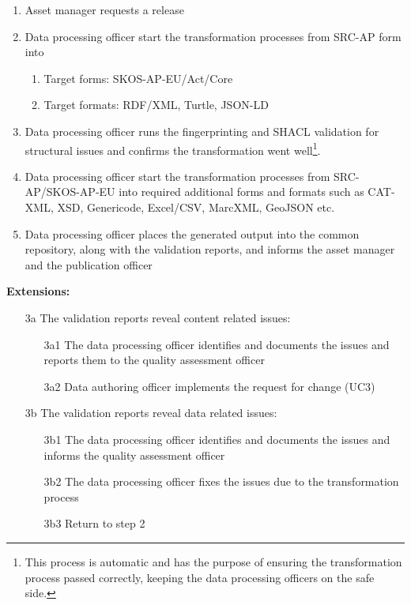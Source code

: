 	\begin{enumerate}
		\item Asset manager requests a release
		\item Data processing officer start the transformation processes from SRC-AP form into 
		\begin{enumerate}
			\item Target forms: SKOS-AP-EU/Act/Core
			\item Target formats: RDF/XML, Turtle, JSON-LD
		\end{enumerate}		
		\item Data processing officer runs the fingerprinting and SHACL validation for structural issues and confirms the transformation went well\footnote{This process is automatic and has the purpose of ensuring the transformation process passed correctly, keeping the data processing officers on the safe side.}.
		\item Data processing officer start the transformation processes from SRC-AP/SKOS-AP-EU into required additional forms and formats such as CAT-XML, XSD, Genericode, Excel/CSV, MarcXML, GeoJSON etc.
		\item Data processing officer places the generated output into the common repository, along with the validation reports, and informs the asset manager and the publication officer		
	\end{enumerate}
	
	\textbf{Extensions:}
	\begin{enumerate}
		\item [3a] The validation reports reveal content related issues:
		\begin{enumerate}
			\item [3a1] The data processing officer identifies and documents the issues and reports them to the quality assessment officer
			\item [3a2] Data authoring officer implements the request for change (UC3)
		\end{enumerate}

		\item [3b] The validation reports reveal data related issues:
		\begin{enumerate}
			\item [3b1] The data processing officer identifies and documents the issues and informs the quality assessment officer
			\item [3b2] The data processing officer fixes the issues due to the transformation process
			\item [3b3] Return to step 2
		\end{enumerate}		
	\end{enumerate}
	

